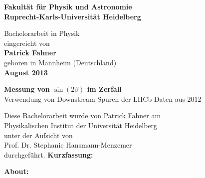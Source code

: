 \begin{titlepage}
\begin{center}
 
\Large\textbf{Fakultät für Physik und Astronomie\\
Ruprecht-Karls-Universität Heidelberg}

\vspace{15cm}

\normalsize
Bachelorarbeit in Physik\\
eingereicht von\\
\vspace{0.5cm}
\Large\textbf{Patrick Fahner}\\
\normalsize
\vspace{0.5cm}
geboren in Mannheim (Deutschland)\\
\vspace{0.5cm}
\Large\textbf{August 2013}

\newpage
\newpage

\normalsize
\Huge{\textbf{Messung von $\sin(2\beta)$ im Zerfall \Decaychannel}} \\
\LARGE{Verwendung von \glqq Downstream\grqq -Spuren der LHCb Daten aus 2012}

\vfill
\normalsize
Diese Bachelorarbeit wurde von Patrick Fahner am\\
Physikalischen Institut der Universität Heidelberg\\
unter der Aufsicht von\\
Prof. Dr. Stephanie Hansmann-Menzemer \\
durchgeführt.
\newpage
\Large\textbf{Kurzfassung:}


\vspace{2cm}
\Large\textbf{About:}





\vfill
\end{center}

\end{titlepage}
